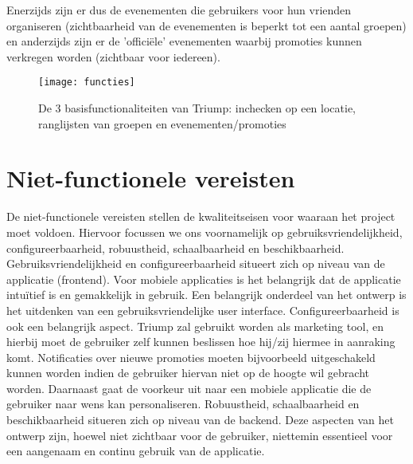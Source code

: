 Enerzijds zijn er dus de evenementen die gebruikers voor hun vrienden organiseren (zichtbaarheid van de evenementen is beperkt tot een aantal groepen) en anderzijds zijn er de 'officiële' evenementen waarbij promoties kunnen verkregen worden (zichtbaar voor iedereen). 
\begin{figure}[H]
	\centering
	\texttt{[image: functies]}
	\label{fig:functions}
	\caption{De 3 basisfunctionaliteiten van Triump: inchecken op een locatie, \newline ranglijsten van groepen en evenementen/promoties}
\end{figure}
\section{Niet-functionele vereisten}
De niet-functionele vereisten stellen de kwaliteitseisen voor waaraan het project moet voldoen. Hiervoor focussen we ons voornamelijk op gebruiksvriendelijkheid, configureerbaarheid, robuustheid, schaalbaarheid en beschikbaarheid.
Gebruiksvriendelijkheid en configureerbaarheid situeert zich op niveau van de applicatie (frontend). Voor mobiele applicaties is het belangrijk dat de applicatie intuïtief is en gemakkelijk in gebruik. Een belangrijk onderdeel van het ontwerp is het uitdenken van een gebruiksvriendelijke user interface. Configureerbaarheid is ook een belangrijk aspect. Triump zal gebruikt worden als marketing tool, en hierbij moet de gebruiker zelf kunnen beslissen hoe hij/zij hiermee in aanraking komt. Notificaties over nieuwe promoties moeten bijvoorbeeld uitgeschakeld kunnen worden indien de gebruiker hiervan niet op de hoogte wil gebracht worden. Daarnaast gaat de voorkeur uit naar een mobiele applicatie die de gebruiker naar wens kan personaliseren.
Robuustheid, schaalbaarheid en beschikbaarheid situeren zich op niveau van de backend. Deze aspecten van het ontwerp zijn, hoewel niet zichtbaar voor de gebruiker, niettemin essentieel voor een aangenaam en continu gebruik van de applicatie.
